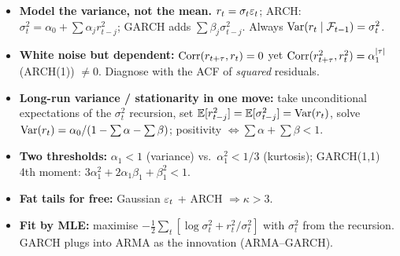 \documentclass[11pt]{article}
\begin{document}
\begin{retenir}
\begin{itemize}
  \item \textbf{Model the variance, not the mean.} $r_t=\sigma_t\varepsilon_t$; ARCH:
        $\sigma_t^2=\alpha_0+\sum\alpha_j r_{t-j}^2$; GARCH adds $\sum\beta_j\sigma_{t-j}^2$.
        Always $\operatorname{Var}(r_t\mid\mathcal F_{t-1})=\sigma_t^2$.
  \item \textbf{White noise but dependent:} $\operatorname{Corr}(r_{t+\tau},r_t)=0$ yet
        $\operatorname{Corr}(r_{t+\tau}^2,r_t^2)=\alpha_1^{\left\lvert \tau \right\rvert}$ (ARCH(1)) $\ne0$. Diagnose with the ACF of
        \emph{squared} residuals.
  \item \textbf{Long-run variance / stationarity in one move:} take unconditional expectations of the
        $\sigma_t^2$ recursion, set $\mathbb{E}[r_{t-j}^2]=\mathbb{E}[\sigma_{t-j}^2]=\operatorname{Var}(r_t)$, solve
        $\operatorname{Var}(r_t)=\alpha_0/(1-\sum\alpha-\sum\beta)$; positivity $\Leftrightarrow\sum\alpha+\sum\beta<1$.
  \item \textbf{Two thresholds:} $\alpha_1<1$ (variance) vs.\ $\alpha_1^2<1/3$ (kurtosis); GARCH(1,1)
        4th moment: $3\alpha_1^2+2\alpha_1\beta_1+\beta_1^2<1$.
  \item \textbf{Fat tails for free:} Gaussian $\varepsilon_t$ + ARCH $\Rightarrow\kappa>3$.
  \item \textbf{Fit by MLE:} maximise $-\tfrac12\sum_t[\log\sigma_t^2+r_t^2/\sigma_t^2]$ with
        $\sigma_t^2$ from the recursion. GARCH plugs into ARMA as the innovation (ARMA--GARCH).
\end{itemize}
\end{retenir}
\end{document}
